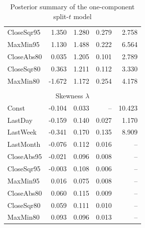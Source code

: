\documentclass[10pt]{beamer}
\begin{document}
\begin{frame}[plain]
{\begin{table}
\begin{centering}
\begin{tabular}{lrrrr}
CloseSqr95 & 1.350 & 1.280 & 0.279 & 2.758\tabularnewline
MaxMin95 & 1.130 & 1.488 & 0.222 & 6.564\tabularnewline
CloseAbs80 &  0.035 & 1.205 & 0.101 & 2.789\tabularnewline
CloseSqr80 & 0.363 & 1.211  & 0.112 & 3.330\tabularnewline
MaxMin80 & -1.672 & 1.172 & 0.254  & 4.178 \tabularnewline
 &  &  &  & \tabularnewline
\multicolumn{5}{c}{Skewness $\lambda$}\tabularnewline
\hline
Const & \multicolumn{1}{r}{-0.104} & \multicolumn{1}{r}{0.033} & \multicolumn{1}{r}{--} & \multicolumn{1}{r}{10.423 }\tabularnewline
LastDay  & \multicolumn{1}{r}{ -0.159} & \multicolumn{1}{r}{ 0.140} & \multicolumn{1}{r}{0.027 } & \multicolumn{1}{r}{1.170 }\tabularnewline
LastWeek & \multicolumn{1}{r}{ -0.341} & \multicolumn{1}{r}{0.170 } & \multicolumn{1}{r}{0.135} & \multicolumn{1}{r}{8.909 }\tabularnewline
LastMonth & \multicolumn{1}{r}{-0.076} & \multicolumn{1}{r}{0.112} & \multicolumn{1}{r}{0.016} & \multicolumn{1}{r}{-- }\tabularnewline
CloseAbs95 & \multicolumn{1}{r}{-0.021} & \multicolumn{1}{r}{0.096} & \multicolumn{1}{r}{0.008} & \multicolumn{1}{r}{-- }\tabularnewline
CloseSqr95 & \multicolumn{1}{r}{ -0.003 } & \multicolumn{1}{r}{ 0.108} & \multicolumn{1}{r}{0.006 } & \multicolumn{1}{r}{--}\tabularnewline
MaxMin95 & \multicolumn{1}{r}{ 0.016} & \multicolumn{1}{r}{0.075} & \multicolumn{1}{r}{0.008} & \multicolumn{1}{r}{--}\tabularnewline
CloseAbs80 & \multicolumn{1}{r}{0.060} & \multicolumn{1}{r}{0.115} & \multicolumn{1}{r}{0.009 } & \multicolumn{1}{r}{--}\tabularnewline
CloseSqr80 & \multicolumn{1}{r}{0.059} & \multicolumn{1}{r}{0.111} & \multicolumn{1}{r}{ 0.010 } & \multicolumn{1}{r}{--}\tabularnewline
MaxMin80 & \multicolumn{1}{r}{0.093 } & \multicolumn{1}{r}{0.096} & \multicolumn{1}{r}{0.013 } & \multicolumn{1}{r}{--}\tabularnewline
\hline
\hline 
\end{tabular} 
\par\end{centering}
\caption{\footnotesize{Posterior summary of the one-component split-$t$ model}}
\end{table}
} 
\end{frame}
\end{document}
